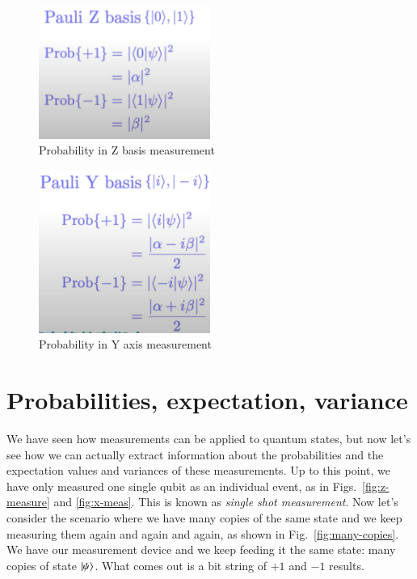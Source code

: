 \begin{figure}[H]
    \centering
    \includegraphics[width=0.5\textwidth]{lesson2/Pauli_z_ex.pdf}
    
        \caption{Probability in Z basis measurement}
    
    \label{fig: 1}
\end{figure}

\begin{figure}[H]
    \centering
    \includegraphics[width=0.5\textwidth]{lesson2/Pauli_y_ex.pdf}
    
        \caption{Probability in Y axis measurement}
    
    \label{fig: 1}
\end{figure}
\fi

\section{Probabilities, expectation, variance}

We have seen how measurements can be applied to quantum states, but now let's see how we can actually extract information about the probabilities and the expectation values and variances of these measurements. Up to this point, we have only measured one single qubit as an individual event, as in Figs.~\ref{fig:z-measure} and \ref{fig:x-meas}.  This is known as \emph{single shot measurement}. Now let's consider the scenario where we have many copies of the same state and we keep measuring them again and again and again, as shown in Fig.~\ref{fig:many-copies}. We have our measurement device and we keep feeding it the same state: many copies of state $\left| \psi \right\rangle$. What comes out is a bit string of $+1$ and $-1$ results.

